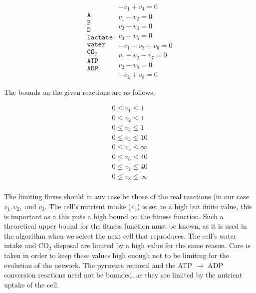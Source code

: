 \documentclass[a4paper,12pt]{article}
\begin{document}
	\begin{equation}\label{eq:lineqs}
	\begin{matrix}
		\texttt{A}  \\
		\texttt{B}\\
		\texttt{D}\\
		\texttt{lactate}\\
		\texttt{water}\\
		\texttt{CO}_2\\
		\texttt{ATP}\\
		\texttt{ADP}
	\end{matrix}
		\begin{matrix}
			- v_1+v_4=0 \\
			v_1-v_2=0 \\
			v_2-v_3=0 \\
			v_3-v_5=0 \\
			-v_1-v_2+v_6=0 \\
			v_1+v_2-v_7=0 \\
			v_2-v_8=0 \\
			-v_2+v_8=0
		\end{matrix}
	\end{equation}

	The bounds on the given reactions are as follows: 

	\begin{equation}\label{eq:bounds}
		\begin{matrix}
			0\leq v_1 \leq 1\\
			0\leq v_2 \leq 1\\
			0\leq v_3 \leq 1\\
			0\leq v_4 \leq 10\\
			0\leq v_5 \leq \infty \\
			0\leq v_6 \leq 40\\
			0\leq v_7 \leq 40\\
			0\leq v_8 \leq \infty\\
		\end{matrix}
	\end{equation}

	The limiting fluxes should in any case be those of the real reactions (in our case $v_1, v_2,$ and $v_3$. The cell's nutrient intake ($v_4$) is set to a high but finite value, this is important as a this puts a high bound on the fitness function. Such a theoretical upper bound for the fitness function must be known, as it is used in the algorithm when we select the next cell that reproduces. The cell's water intake and CO$_2$ disposal are limited by a high value for the same reason. Care is taken in order to keep these values high enough not to be limiting for the evolution of the network. %
	The pyruvate removal and the ATP $\rightarrow$ ADP conversion reactions need not be bounded, as they are limited by the nutrient uptake of the cell. 
\end{document}
